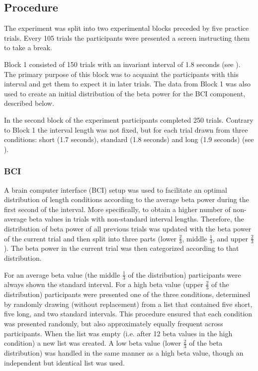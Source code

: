 \documentclass[man,floatsintext]{apa6} %
\begin{document}
\subsection{Procedure}
The experiment was split into two experimental blocks preceded by five
practice trials. Every 105 trials the participants were presented a
screen instructing them to take a break.

Block 1 consisted of 150 trials with an invariant interval of 1.8
seconds (see ). The primary purpose of this block was
to acquaint the participants with this interval and get them to expect
it in later trials. The data from Block 1 was also used to create an
initial distribution of the beta power for the BCI component,
described below.

In the second block of the experiment participants completed 250
trials. Contrary to Block 1 the interval length was not fixed, but for
each trial drawn from three conditions: short (1.7 seconds), standard
(1.8 seconds) and long (1.9 seconds) (see ).

\subsubsection{BCI}
A brain computer interface (BCI) setup was used to facilitate an
optimal distribution of length conditions according to the average
beta power during the first second of the interval. More specifically,
to obtain a higher number of non-average beta values in trials with
non-standard interval lengths. Therefore, the distribution of beta
power of all previous trials was updated with the beta power of the
current trial and then split into three parts (lower $\frac{2}{3}$,
middle $\frac{1}{3}$, and upper $\frac{2}{3}$). The beta power in the
current trial was then categorized according to that distribution.

For an average beta value (the middle $\frac{1}{3}$ of the
distribution) participants were always shown the standard
interval. For a high beta value (upper $\frac{2}{3}$ of the
distribution) participants were presented one of the three conditions,
determined by randomly drawing (without replacement) from a list that
contained five short, five long, and two standard intervals. This
procedure ensured that each condition was presented randomly, but also
approximately equally frequent across participants. When the list was
empty (i.e. after 12 beta values in the high condition) a new list was
created. A low beta value (lower $\frac{2}{3}$ of the beta
distribution) was handled in the same manner as a high beta value,
though an independent but identical list was used.
\end{document}
